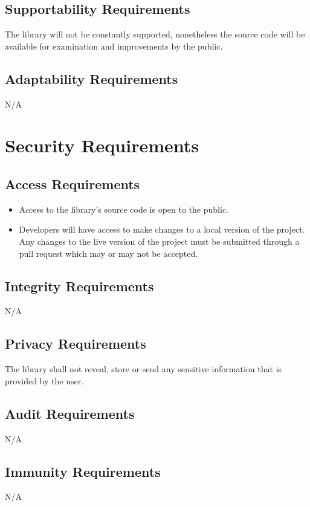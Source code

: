 \documentclass[12pt]{article}
\begin{document}
\subsection {Supportability Requirements}
The library will not be constantly supported, nonetheless the source code will be available for examination and improvements by the public.

\subsection {Adaptability Requirements}
N/A

\section {Security Requirements}

\subsection {Access Requirements}
\begin{itemize}
  \item Access to the library’s source code is open to the public.
  \item Developers will have access to make changes to a local version of the project. Any changes to the live version of the project must be submitted through a pull request which may or may not be accepted.
\end{itemize}

\subsection {Integrity Requirements}
N/A

\subsection {Privacy Requirements}
The library shall not reveal, store or send any sensitive information that is provided by the user. 

\subsection {Audit Requirements}
N/A

\subsection {Immunity Requirements}
N/A
\end{document}

